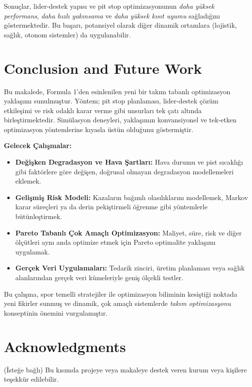 \documentclass[preprint,12pt]{elsarticle}
\begin{document}
Sonuçlar, lider-destek yapısı ve pit stop optimizasyonunun \emph{daha yüksek performans}, \emph{daha hızlı yakınsama} ve \emph{daha yüksek kısıt uyumu} sağladığını göstermektedir. Bu başarı, potansiyel olarak diğer dinamik ortamlara (lojistik, sağlık, otonom sistemler) da uygulanabilir.

\section{Conclusion and Future Work}
\label{sec:conclusion}

Bu makalede, Formula 1’den esinlenilen yeni bir takım tabanlı optimizasyon yaklaşımı sunulmuştur. Yöntem; pit stop planlaması, lider-destek çözüm etkileşimi ve risk odaklı karar verme gibi unsurları tek çatı altında birleştirmektedir. Simülasyon deneyleri, yaklaşımın konvansiyonel ve tek-etken optimizasyon yöntemlerine kıyasla üstün olduğunu göstermiştir.

\textbf{Gelecek Çalışmalar:}
\begin{itemize}
    \item \textbf{Değişken Degradasyon ve Hava Şartları:} Hava durumu ve pist sıcaklığı gibi faktörlere göre değişen, doğrusal olmayan degradasyon modellemeleri eklemek.
    \item \textbf{Gelişmiş Risk Modeli:} Kazaların bağımlı olasılıklarını modellemek, Markov karar süreçleri ya da derin pekiştirmeli öğrenme gibi yöntemlerle bütünleştirmek.
    \item \textbf{Pareto Tabanlı Çok Amaçlı Optimizasyon:} Maliyet, süre, risk ve diğer ölçütleri aynı anda optimize etmek için Pareto optimalite yaklaşımı uygulamak.
    \item \textbf{Gerçek Veri Uygulamaları:} Tedarik zinciri, üretim planlaması veya sağlık alanlarından gerçek veri kümeleriyle geniş ölçekli testler.
\end{itemize}

Bu çalışma, spor temelli stratejiler ile optimizasyon biliminin kesiştiği noktada yeni fikirler sunmuş ve dinamik, çok amaçlı sistemlerde \textit{takım optimizasyonu} konseptinin önemini vurgulamıştır.

\section*{Acknowledgments}
(İsteğe bağlı) Bu kısımda projeye veya makaleye destek veren kurum veya kişilere teşekkür edilebilir.
\end{document}
